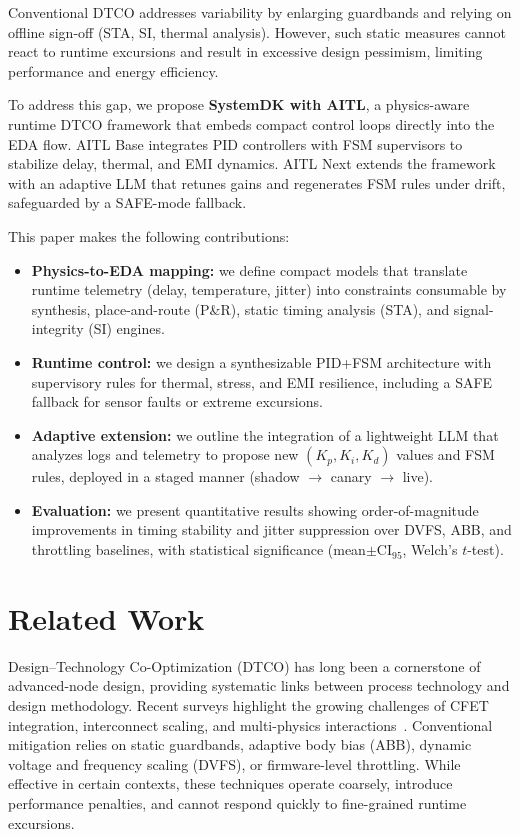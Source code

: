 \documentclass[conference]{IEEEtran}
\newcommand{\CI}{\mathrm{CI}_{95}}
\begin{document}
Conventional DTCO addresses variability by enlarging guardbands and relying on offline sign-off (STA, SI, thermal analysis). However, such static measures cannot react to runtime excursions and result in excessive design pessimism, limiting performance and energy efficiency.

To address this gap, we propose \textbf{SystemDK with AITL}, a physics-aware runtime DTCO framework that embeds compact control loops directly into the EDA flow. AITL Base integrates PID controllers with FSM supervisors to stabilize delay, thermal, and EMI dynamics. AITL Next extends the framework with an adaptive LLM that retunes gains and regenerates FSM rules under drift, safeguarded by a SAFE-mode fallback.

This paper makes the following contributions:
\begin{itemize}
  \item \textbf{Physics-to-EDA mapping:} we define compact models that translate runtime telemetry (delay, temperature, jitter) into constraints consumable by synthesis, place-and-route (P\&R), static timing analysis (STA), and signal-integrity (SI) engines.
  \item \textbf{Runtime control:} we design a synthesizable PID+FSM architecture with supervisory rules for thermal, stress, and EMI resilience, including a SAFE fallback for sensor faults or extreme excursions.
  \item \textbf{Adaptive extension:} we outline the integration of a lightweight LLM that analyzes logs and telemetry to propose new $(K_p,K_i,K_d)$ values and FSM rules, deployed in a staged manner (shadow $\rightarrow$ canary $\rightarrow$ live).
  \item \textbf{Evaluation:} we present quantitative results showing order-of-magnitude improvements in timing stability and jitter suppression over DVFS, ABB, and throttling baselines, with statistical significance (mean$\pm\CI$, Welch’s $t$-test).
\end{itemize}

\section{Related Work}
Design--Technology Co-Optimization (DTCO) has long been a cornerstone of advanced-node design, providing systematic links between process technology and design methodology. Recent surveys highlight the growing challenges of CFET integration, interconnect scaling, and multi-physics interactions~\cite{yakimets,irds}. Conventional mitigation relies on static guardbands, adaptive body bias (ABB), dynamic voltage and frequency scaling (DVFS), or firmware-level throttling. While effective in certain contexts, these techniques operate coarsely, introduce performance penalties, and cannot respond quickly to fine-grained runtime excursions.
\end{document}
